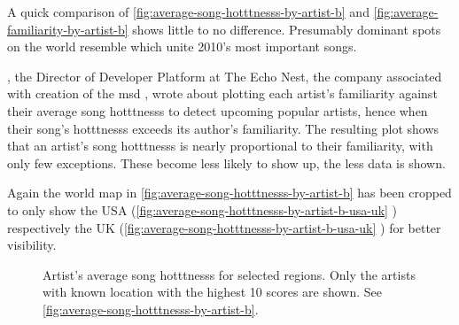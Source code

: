 \documentclass[                                                             %
        12pt,                                                                   %
        twoside                                                                 %
    ]{scrartcl}                                                                 %
\begin{document}
A quick comparison of \autoref{fig:average-song-hotttnesss-by-artist-b} 
and \autoref{fig:average-familiarity-by-artist-b} shows little to no difference.
Presumably dominant spots on the world resemble 
which unite 2010's most important songs.

\textcite{lamere2018hottt}, the Director of Developer Platform
at The Echo Nest, the company associated 
with creation of the \gls{msd} \parencite[591]{bertin2011million},
wrote about plotting each artist's familiarity
against their average song hotttnesss 
to detect upcoming popular artists, 
hence when their song's hotttnesss 
exceeds its author's familiarity.
The resulting plot shows that an artist's song hotttnesss 
is nearly proportional to their familiarity, with only few exceptions.
These become less likely to show up, the less data is shown.

Again the world map in \autoref{fig:average-song-hotttnesss-by-artist-b} has been cropped
to only show the USA (\autoref{fig:average-song-hotttnesss-by-artist-b-usa-uk}%
) 
respectively the UK (\autoref{fig:average-song-hotttnesss-by-artist-b-usa-uk}%
) for better visibility.

\begin{figure}
    \centering
    \caption[Artist's average song hotttnesss for selected regions.]{%
        Artist's average song hotttnesss for selected regions.
        Only the artists with known location with the highest 10 scores are shown.
        See \autoref{fig:average-song-hotttnesss-by-artist-b}.
    }
    \label{fig:average-song-hotttnesss-by-artist-b-usa-uk}
    \hfill
\end{figure}
\end{document}
